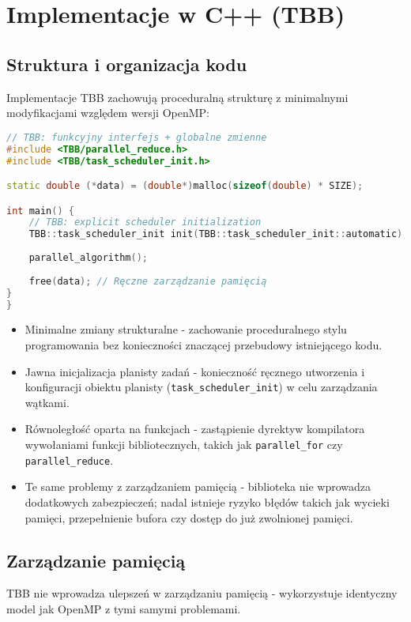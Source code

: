 \section{Implementacje w C++ (TBB)}
\subsection{Struktura i organizacja kodu}
Implementacje TBB zachowują proceduralną strukturę z minimalnymi modyfikacjami względem wersji OpenMP:
\begin{lstlisting}[language=C++, style=VS2017,  caption={Implementacja TBB - struktura kodu}, label={lst:TBB-structure}]
// TBB: funkcyjny interfejs + globalne zmienne
#include <TBB/parallel_reduce.h>
#include <TBB/task_scheduler_init.h>

static double (*data) = (double*)malloc(sizeof(double) * SIZE);

int main() {
    // TBB: explicit scheduler initialization  
    TBB::task_scheduler_init init(TBB::task_scheduler_init::automatic);
    
    parallel_algorithm();
    
    free(data); // Ręczne zarządzanie pamięcią
}
}
\end{lstlisting}
\begin{itemize}
    \item Minimalne zmiany strukturalne - zachowanie proceduralnego stylu programowania bez konieczności znaczącej przebudowy istniejącego kodu.
    
    \item Jawna inicjalizacja planisty zadań - konieczność ręcznego utworzenia i konfiguracji obiektu planisty (\texttt{task\_scheduler\_init}) w celu zarządzania wątkami.
    
    \item Równoległość oparta na funkcjach - zastąpienie dyrektyw kompilatora wywołaniami funkcji bibliotecznych, takich jak \texttt{parallel\_for} czy \texttt{parallel\_reduce}.
    
    \item Te same problemy z zarządzaniem pamięcią - biblioteka nie wprowadza dodatkowych zabezpieczeń; nadal istnieje ryzyko błędów takich jak wycieki pamięci, przepełnienie bufora czy dostęp do już zwolnionej pamięci.
\end{itemize}
  
\subsection{Zarządzanie pamięcią}
TBB nie wprowadza ulepszeń w zarządzaniu pamięcią - wykorzystuje identyczny model jak OpenMP z tymi samymi problemami.

